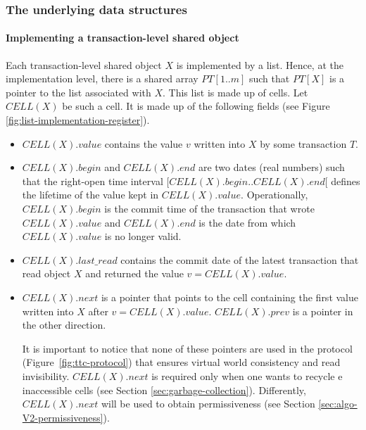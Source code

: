 \subsubsection{The underlying data structures}
\paragraph{Implementing a transaction-level shared object}  
%
Each  transaction-level shared object $X$ is  implemented by  a list.  
Hence, at the implementation level, there is a shared array $PT[1..m]$ 
such that  $PT[X]$ is a pointer to the list associated with $X$. 
This list is made up of cells. Let $CELL(X)$ be such a cell. It is made up of 
the following fields (see Figure \ref{fig:list-implementation-register}).
%
\begin{itemize}  
\vspace{-0.1cm}
\item  
$CELL(X).value$ contains the  value $v$  written into $X$ by some 
transaction $T$. 
%
\vspace{-0.2cm}
\item   
$CELL(X).begin$  and $CELL(X).end$  are two dates (real numbers) such 
that the right-open time  interval  $[CELL(X).begin.. CELL(X).end[$  
defines the lifetime of the value kept in  $CELL(X).value$.  
Operationally,  
$CELL(X).begin$ is the commit time of the transaction that wrote 
$CELL(X).value$ and  $CELL(X).end$ is the date from which $CELL(X).value$ 
is no longer valid.
%
\vspace{-0.2cm}
\item 
$\mathit{CELL(X)}.last\_read$ contains the  commit date of the latest
transaction that  read  object $X$ and returned the value $v=CELL(X).value$.
%
\vspace{-0.2cm}
\item 
$CELL(X).next$ is a pointer  that points to the cell 
containing the first value  written into $X$ after $v=CELL(X).value$.
$CELL(X).prev$ is a  pointer in the other direction.

It is important to notice that none of these pointers are used 
in the protocol (Figure~\ref{fig:ttc-protocol})
that ensures virtual world consistency and read invisibility.
$CELL(X).next$ is required only when one wants to recycle
e inaccessible 
cells (see Section \ref{sec:garbage-collection}).  Differently,
$CELL(X).next$ will be  used to obtain permissiveness
(see Section \ref{sec:algo-V2-permissiveness}).
\end{itemize}



